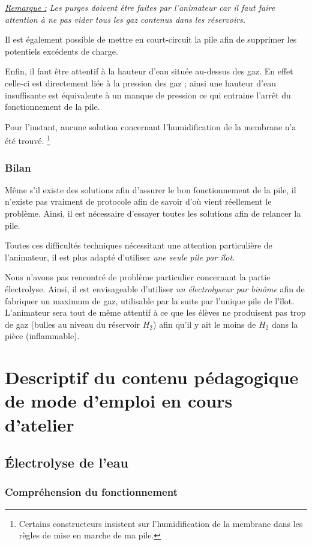 \documentclass[a4paper, 11pt, twoside]{article}
\numberwithin{equation}{subsection}
\newcommand{\rem}[1]{\textit{\underline{Remarque :} #1}}
\begin{document}
	\rem{Les purges doivent être faites par l'animateur car il faut faire attention à ne pas vider tous les gaz contenus dans les réservoirs.}
	
	Il est également possible de mettre en court-circuit la pile afin de supprimer les potentiels excédents de charge. 
	
	Enfin, il faut être attentif à la hauteur d'eau située au-dessus des gaz. En effet celle-ci est directement liée à la pression des gaz ; ainsi une hauteur d'eau insuffisante est équivalente à un manque de pression ce qui entraine l'arrêt du fonctionnement de la pile.
	
	Pour l'instant, aucune solution concernant l'humidification de la membrane n'a été trouvé. \footnote{Certains constructeurs insistent sur l'humidification de la membrane dans les règles de mise en marche de ma pile.}
	
	\subsubsection{Bilan}
	
	Même s'il existe des solutions afin d'assurer le bon fonctionnement de la pile, il n'existe pas vraiment de protocole afin de savoir d'où vient réellement le problème. Ainsi, il est nécessaire d'essayer toutes les solutions afin de relancer la pile.
	
	Toutes ces difficultés techniques nécessitant une attention particulière de l'animateur, il est plus adapté d'utiliser \emph{une seule pile par îlot}.
	
	Nous n'avons pas rencontré de problème particulier concernant la partie électrolyse. Ainsi, il est envisageable d'utiliser \emph{un électrolyseur par binôme} afin de fabriquer un maximum de gaz, utilisable par la suite par l'unique pile de l'îlot. L'animateur sera tout de même attentif à ce que les élèves ne produisent pas trop de gaz (bulles au niveau du réservoir $H_2$) afin qu'il y ait le moins de $H_2$ dans la pièce (inflammable).
	
	\section{Descriptif du contenu pédagogique de mode d'emploi en cours d'atelier}
		\subsection{Électrolyse de l'eau}
		
		\subsubsection{Compréhension du fonctionnement}
		
\end{document}
